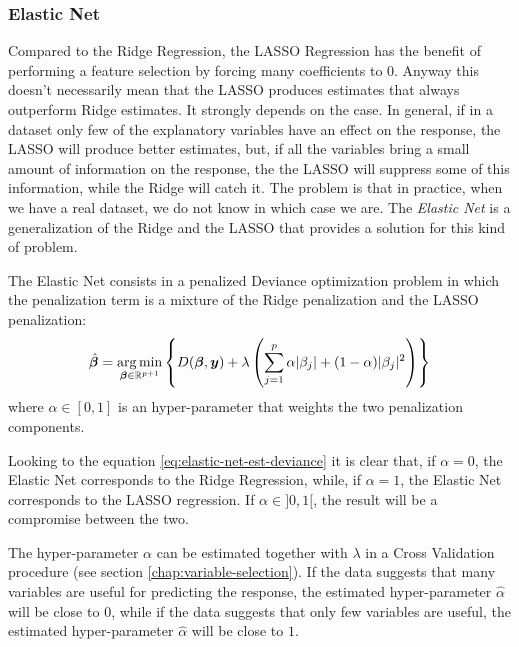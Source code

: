 \documentclass[a4paper, nobind]{templates/ociamthesis}
\theoremstyle{definition}
\theoremstyle{definition}
\theoremstyle{definition}
\theoremstyle{remark}
\begin{document}
\hypertarget{elastic-net}{%
\subsubsection{Elastic Net}\label{elastic-net}}

Compared to the Ridge Regression, the LASSO Regression has the benefit of performing a feature selection by forcing many coefficients to \(0\). Anyway this doesn't necessarily mean that the LASSO produces estimates that always outperform Ridge estimates. It strongly depends on the case. In general, if in a dataset only few of the explanatory variables have an effect on the response, the LASSO will produce better estimates, but, if all the variables bring a small amount of information on the response, the the LASSO will suppress some of this information, while the Ridge will catch it. The problem is that in practice, when we have a real dataset, we do not know in which case we are. The \emph{Elastic Net} is a generalization of the Ridge and the LASSO that provides a solution for this kind of problem.

The Elastic Net consists in a penalized Deviance optimization problem in which the penalization term is a mixture of the Ridge penalization and the LASSO penalization:
\begin{equation}
\label{eq:elastic-net-est-deviance}
\hat{\boldsymbol{\beta}} =  \operatorname*{arg\,min}_{\boldsymbol{\beta}\in\mathbb{R}^{p+1}}{\left\{
D(\boldsymbol{\beta}, \boldsymbol{y}) +
\lambda \left(
\sum_{j=1}^p{\alpha |\beta_j| + (1 - \alpha) |\beta_j|^2}
\right)
\right\}}
\end{equation}
where \(\alpha \in [0,1]\) is an hyper-parameter that weights the two penalization components.

Looking to the equation \eqref{eq:elastic-net-est-deviance} it is clear that, if \(\alpha=0\), the Elastic Net corresponds to the Ridge Regression, while, if \(\alpha=1\), the Elastic Net corresponds to the LASSO regression. If \(\alpha \in ]0,1[\), the result will be a compromise between the two.

The hyper-parameter \(\alpha\) can be estimated together with \(\lambda\) in a Cross Validation procedure (see section \ref{chap:variable-selection}). If the data suggests that many variables are useful for predicting the response, the estimated hyper-parameter \(\hat{\alpha}\) will be close to \(0\), while if the data suggests that only few variables are useful, the estimated hyper-parameter \(\hat{\alpha}\) will be close to \(1\).
\end{document}
